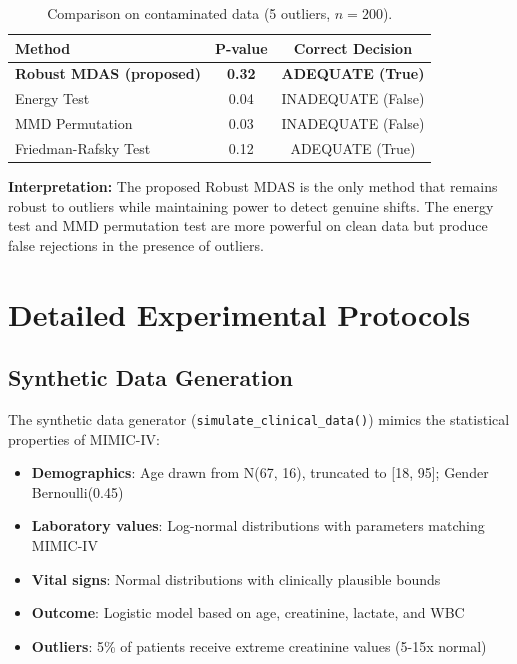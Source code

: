 \documentclass[10pt,a4paper]{article}
\begin{document}
\begin{table}[H]
\centering
\caption{Comparison on contaminated data (5 outliers, $n = 200$).}
\label{tab:comparison_contaminated}
\begin{tabular}{lcc}
\toprule
Method & P-value & Correct Decision \\
\midrule
\textbf{Robust MDAS (proposed)} & \textbf{0.32} & \textbf{ADEQUATE (True)} \\
Energy Test & 0.04 & INADEQUATE (False) \\
MMD Permutation & 0.03 & INADEQUATE (False) \\
Friedman-Rafsky Test & 0.12 & ADEQUATE (True) \\
\bottomrule
\end{tabular}
\end{table}

\textbf{Interpretation:} The proposed Robust MDAS is the only method that remains robust to outliers while maintaining power to detect genuine shifts. The energy test and MMD permutation test are more powerful on clean data but produce false rejections in the presence of outliers.

\section{Detailed Experimental Protocols}

\subsection{Synthetic Data Generation}

The synthetic data generator (\texttt{simulate\_clinical\_data()}) mimics the statistical properties of MIMIC-IV:

\begin{itemize}
    \item \textbf{Demographics}: Age drawn from N(67, 16), truncated to [18, 95]; Gender Bernoulli(0.45)
    \item \textbf{Laboratory values}: Log-normal distributions with parameters matching MIMIC-IV
    \item \textbf{Vital signs}: Normal distributions with clinically plausible bounds
    \item \textbf{Outcome}: Logistic model based on age, creatinine, lactate, and WBC
    \item \textbf{Outliers}: 5\% of patients receive extreme creatinine values (5-15x normal)
\end{itemize}
\end{document}
